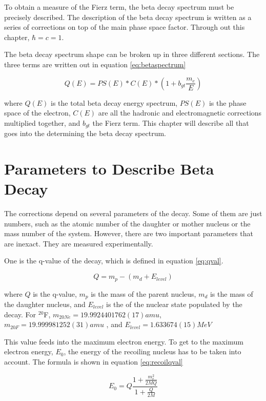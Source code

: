 \documentclass[../MaxHughesThesis.tex]{subfiles}
\begin{document}
To obtain a measure of the Fierz term, the beta decay spectrum must be precisely described.
The description of the beta decay spectrum is written as a series of corrections on top of the main phase space factor.  
Through out this chapter, $\hbar = c = 1$.

The beta decay spectrum shape can be broken up in three different sections.
The three terms are written out in equation \ref{eq:betaspectrum}

\begin{equation}
	Q(E) = PS(E) * C(E) * (1 + b_{gt}\frac{m_{e}}{E})
	\label{eq:betaspectrum}
\end{equation}

where $Q(E)$ is the total beta decay energy spectrum, $PS(E)$ is the phase space of the electron, $C(E)$ are all the hadronic and electromagnetic corrections multiplied together, and $b_{gt}$ the Fierz term.
This chapter will describe all that goes into the determining the beta decay spectrum.

\section{Parameters to Describe Beta Decay}
The corrections depend on several parameters of the decay. 
Some of them are just numbers, such as the atomic number of the daughter or mother nucleus or the mass number of the system.
However, there are two important parameters that are inexact.
They are measured experimentally.

One is the q-value of the decay, which is defined in equation \ref{eq:qval}.

\begin{equation}
	Q = m_{p} - (m_{d} + E_{level})
	\label{eq:qval}
\end{equation} 

where $Q$ is the q-value, $m_{p}$ is the mass of the parent nucleus, $m_{d}$ is the mass of the daughter nucleus, and $E_{level}$ is the of the nuclear state populated by the decay. 
For $^{20}$F, $m_{20Ne} = 19.9924401762 (17) amu$, $m_{20F} = 19.999981252 (31) amu$ \cite{Wan17} , and $E_{level} = 1.633674 (15) MeV $ \cite{Til98}    

This value feeds into the maximum electron energy.
To get to the maximum electron energy, $E_{0}$, the energy of the recoiling nucleus has to be taken into account.
The formula is shown in equation \ref{eq:recoilqval}

\begin{equation}
	E_{0} = Q\frac{1 + \frac{m_{e}^{2}}{2MQ}}{1 + \frac{Q}{2M}} 
	\label{eq:recoilqval}
\end{equation} 
\end{document}
